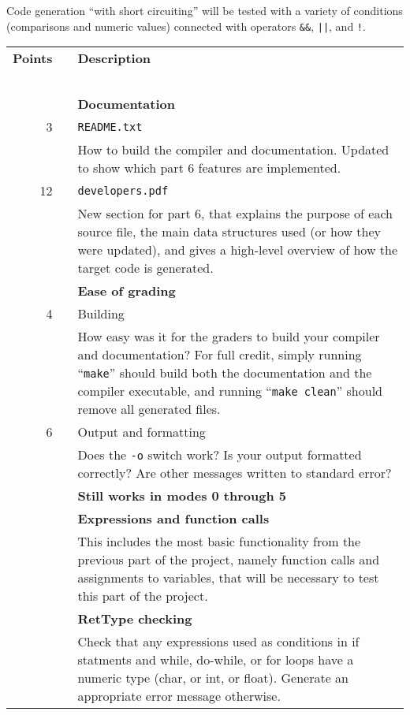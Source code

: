 \documentclass{article}
\makeatletter
\newcommand{\codegen}{5}
\newcommand{\flowgen}{6}
\newcommand{\gradeline}{ \cline{1-2} \cline{4-4} ~\\[-1.5ex] }
\newenvironment{gradetable}{\begin{longtable}{@{~~}rrcp{5in}} \multicolumn{2}{l}{\bf Points} & & {\bf Description}\\ \gradeline}{\end{longtable}}
\newcommand{\mainitem}[2]{\pagebreak[2] {\bf #1} &&& {\bf #2}}
\newcommand{\mainpara}[1]{~ &&& {#1} }
\newcommand{\inneritem}[2]{~ & #1 && #2}
\newcommand{\innerpara}[1]{~ & ~ && #1}
\makeatother
\begin{document}
Code generation ``with short circuiting''
will be tested with a variety of conditions
(comparisons and numeric values)
connected with operators \verb|&&|, \verb+||+, and \verb|!|.


\noindent
\begin{gradetable}
  \mainitem{15}{Documentation}
  \\[1mm]
  \inneritem{3}{\tt README.txt}
  \\[1mm]
  \innerpara{%
    How to build the compiler and documentation.
    Updated to show which part \flowgen{} features are implemented.
  }
  \\[1mm]
  \inneritem{12}{\tt developers.pdf}
  \\[1mm]
  \innerpara{%
    New section for part \flowgen{}, that explains
    the purpose of each source file,
    the main data structures used (or how they were updated),
    and gives a high-level overview of how the target code
    is generated.
  }
  \\[4mm]

  \mainitem{10}{Ease of grading}
  \\[1mm]
  \inneritem{4}{Building}
  \\[1mm]
  \innerpara{%
    How easy was it for the graders to build your compiler and
    documentation?
    For full credit, simply running ``{\tt make}''
    should build both the documentation and the compiler executable,
    and running ``{\tt make clean}'' should remove
    all generated files.
  }
  \\[1mm]
  \inneritem{6}{Output and formatting}
  \\[1mm]
  \innerpara{%
    Does the {\tt -o} switch work?
    Is your output formatted correctly?
    Are other messages written to standard error?
  }
  \\[4mm]

  \mainitem{10}{Still works in modes 0 through \codegen}
  \\[4mm]

  \mainitem{15}{Expressions and function calls}
  \\[1mm]
  \mainpara{%
    This includes the most basic functionality from the previous part of the
    project, namely function calls and assignments to variables,
    that will be necessary to test this part of the project.
  }
  \\[4mm]

  \mainitem{5}{RetType checking}
  \\[1mm]
  \mainpara{%
    Check that any expressions used as conditions in if statments
    and while, do-while, or for loops
    have a numeric type (char, or int, or float).
    Generate an appropriate error message otherwise.
  }
  \\[4mm]


\end{gradetable}
\end{document}
